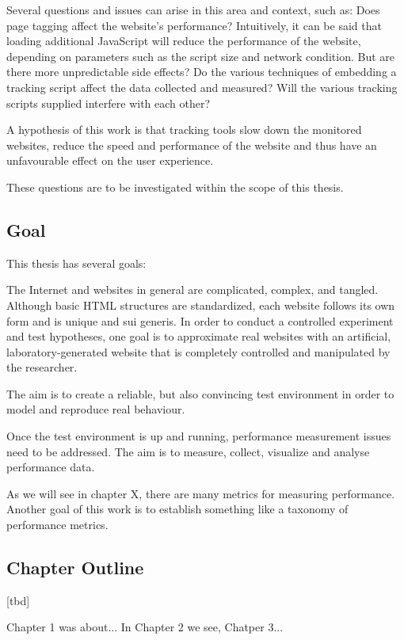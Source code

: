 Several questions and issues can arise in this area and context, such as: Does page tagging affect the website's performance?
Intuitively, it can be said that loading additional JavaScript will reduce the performance of the website, depending on parameters such as the script size and network condition.
But are there more unpredictable side effects?
Do the various techniques of embedding a tracking script affect the data collected and measured?
Will the various tracking scripts supplied interfere with each other?

A hypothesis of this work is that tracking tools slow down the monitored websites, reduce the speed and performance of the website and thus have an unfavourable effect on the user experience.

These questions are to be investigated within the scope of this thesis.


\subsection{Goal}

This thesis has several goals:

The Internet and websites in general are complicated, complex, and tangled.
Although basic HTML structures are standardized, each website follows its own form and is unique and sui generis.
In order to conduct a controlled experiment and test hypotheses, one goal is to approximate real websites with an artificial, laboratory-generated website that is completely controlled and manipulated by the researcher.

The aim is to create a reliable, but also convincing test environment in order to model and reproduce real behaviour.

Once the test environment is up and running, performance measurement issues need to be addressed.
The aim is to measure, collect, visualize and analyse performance data.

As we will see in chapter X, there are many metrics for measuring performance.
Another goal of this work is to establish something like a taxonomy of performance metrics.









\subsection{Chapter Outline}

[tbd]


Chapter 1 was about...
In Chapter 2 we see,
Chatper 3...













